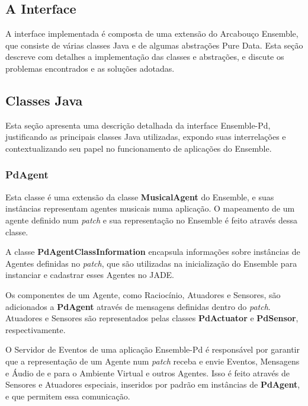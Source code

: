 \documentclass[a4paper, 11pt, twoside]{article}
\begin{document}
\begin{multicols}{2}

\section{A Interface}

A interface implementada é composta de uma extensão do Arcabouço Ensemble,
que consiste de várias classes Java e de algumas abstrações Pure Data.
Esta seção descreve com detalhes a implementação das classes e abstrações,
e discute os problemas encontrados e as soluções adotadas.

\subsection{Classes Java}

Esta seção apresenta uma descrição detalhada da interface Ensemble-Pd,
justificando as principais classes Java utilizadas, expondo suas 
interrelações e contextualizando seu papel no funcionamento de aplicações
do Ensemble.

\subsubsection{PdAgent}

Esta classe é uma extensão da classe \textbf{MusicalAgent} do Ensemble,
e suas instâncias representam agentes musicais numa aplicação.
O mapeamento de um agente definido num \textit{patch} e sua representação no 
Ensemble é feito através dessa classe.

A classe \textbf{PdAgentClassInformation} encapsula informações sobre
instâncias de Agentes definidas no \textit{patch}, que são utilizadas na
inicialização do Ensemble para instanciar e cadastrar esses Agentes no
JADE.

Os componentes de um Agente, como Raciocínio, Atuadores e Sensores, são
adicionados a \textbf{PdAgent} através de mensagens definidas dentro do
\textit{patch}. Atuadores e Sensores são representados pelas classes 
\textbf{PdActuator} e \textbf{PdSensor}, respectivamente.

O Servidor de Eventos de uma aplicação Ensemble-Pd é responsável por garantir 
que a representação de um Agente num \textit{patch} receba e envie Eventos, 
Mensagens e Áudio de e para o Ambiente Virtual e outros Agentes. Isso é feito
através de Sensores e Atuadores especiais, inseridos por padrão em instâncias
de \textbf{PdAgent}, e que permitem essa comunicação.


\end{multicols}
\end{document}
